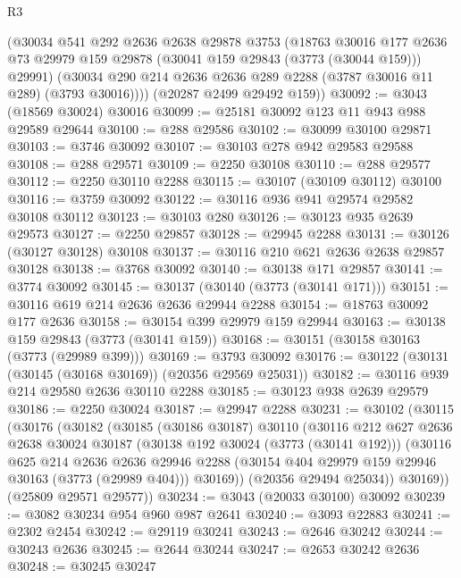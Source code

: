 \begin{lexlean}{R3}
\begin{coremodule}
        (@30034
          @541
          @292
          @2636
          @2638
          @29878
          @3753
          (@18763
            @30016
            @177
            @2636
            @73
            @29979
            @159
            @29878
            (@30041 @159 @29843 (@3773 (@30044 @159)))
            @29991)
          (@30034 @290 @214 @2636 @2636 @289 @2288 (@3787 @30016 @11 @289) (@3793 @30016))))
      (@20287 @2499 @29492 @159))
@30092 := @3043 (@18569 @30024) @30016
@30099 := @25181 @30092 @123 @11 @943 @988 @29589 @29644
@30100 := @288 @29586
@30102 := @30099 @30100 @29871
@30103 := @3746 @30092
@30107 := @30103 @278 @942 @29583 @29588
@30108 := @288 @29571
@30109 := @2250 @30108
@30110 := @288 @29577
@30112 := @2250 @30110 @2288
@30115 := @30107 (@30109 @30112) @30100
@30116 := @3759 @30092
@30122 := @30116 @936 @941 @29574 @29582 @30108 @30112
@30123 := @30103 @280
@30126 := @30123 @935 @2639 @29573
@30127 := @2250 @29857
@30128 := @29945 @2288
@30131 := @30126 (@30127 @30128) @30108
@30137 := @30116 @210 @621 @2636 @2638 @29857 @30128
@30138 := @3768 @30092
@30140 := @30138 @171 @29857
@30141 := @3774 @30092
@30145 := @30137 (@30140 (@3773 (@30141 @171)))
@30151 := @30116 @619 @214 @2636 @2636 @29944 @2288
@30154 := @18763 @30092 @177 @2636
@30158 := @30154 @399 @29979 @159 @29944
@30163 := @30138 @159 @29843 (@3773 (@30141 @159))
@30168 := @30151 (@30158 @30163 (@3773 (@29989 @399)))
@30169 := @3793 @30092
@30176 := @30122 (@30131 (@30145 (@30168 @30169)) (@20356 @29569 @25031))
@30182 := @30116 @939 @214 @29580 @2636 @30110 @2288
@30185 := @30123 @938 @2639 @29579
@30186 := @2250 @30024
@30187 := @29947 @2288
@30231 := @30102
    (@30115
      (@30176
        (@30182
          (@30185
            (@30186 @30187)
            @30110
            (@30116
              @212
              @627
              @2636
              @2638
              @30024
              @30187
              (@30138 @192 @30024 (@3773 (@30141 @192)))
              (@30116
                @625
                @214
                @2636
                @2636
                @29946
                @2288
                (@30154 @404 @29979 @159 @29946 @30163 (@3773 (@29989 @404)))
                @30169))
            (@20356 @29494 @25034))
          @30169))
      (@25809 @29571 @29577))
@30234 := @3043 (@20033 @30100) @30092
@30239 := @3082 @30234 @954 @960 @987 @2641
@30240 := @3093 @22883
@30241 := @2302 @2454
@30242 := @29119 @30241
@30243 := @2646 @30242
@30244 := @30243 @2636
@30245 := @2644 @30244
@30247 := @2653 @30242 @2636
@30248 := @30245 @30247

\end{coremodule}
\end{lexlean}
